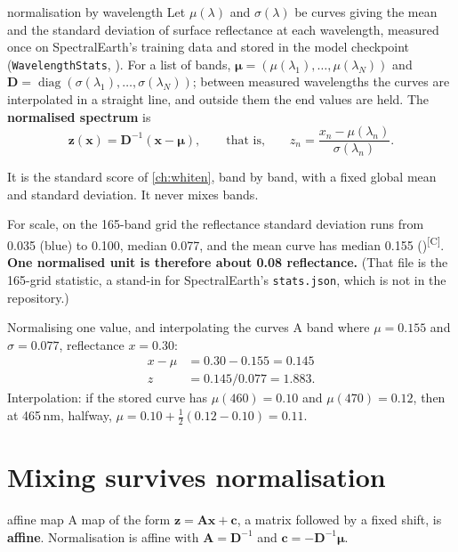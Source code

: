 \documentclass[11pt,a4paper,oneside,openany]{book}
\newcommand{\B}[1]{{\symbf{#1}}}
\newcommand{\B}[1]{{\bm{#1}}}
\newcommand{\comp}{\textsuperscript{\textsf{\scriptsize[C]}}}
\newcommand{\vx}{\B{x}}
\newcommand{\vz}{\B{z}}
\newcommand{\vc}{\B{c}}
\newcommand{\vmu}{\B{\mu}}
\newcommand{\mD}{\B{D}}
\newcommand{\mA}{\B{A}}
\begin{document}
\begin{defn}{normalisation by wavelength}
Let $\mu(\lambda)$ and $\sigma(\lambda)$ be curves giving the mean and the standard deviation of surface reflectance at each
wavelength, measured once on SpectralEarth's training data and stored in the model checkpoint (\texttt{WavelengthStats},
). For a list of bands, $\vmu=(\mu(\lambda_1),\dots,\mu(\lambda_N))$ and
$\mD=\operatorname{diag}(\sigma(\lambda_1),\dots,\sigma(\lambda_N))$; between measured wavelengths the curves are interpolated in a
straight line, and outside them the end values are held. The \textbf{normalised spectrum} is
\[
  \vz(\vx)=\mD^{-1}(\vx-\vmu),\qquad\text{that is,}\qquad z_n=\frac{x_n-\mu(\lambda_n)}{\sigma(\lambda_n)} .
\]
\end{defn}

It is the standard score of \cref{ch:whiten}, band by band, with a fixed global mean and standard deviation. It never mixes bands.

For scale, on the 165-band grid the reflectance standard deviation runs from 0.035 (blue) to 0.100, median 0.077, and the mean curve
has median 0.155 ()\comp. \textbf{One normalised unit is therefore about 0.08 reflectance.} (That
file is the 165-grid statistic, a stand-in for SpectralEarth's \texttt{stats.json}, which is not in the repository.)

\begin{worked}[label=we:norm]{Normalising one value, and interpolating the curves}
A band where $\mu=0.155$ and $\sigma=0.077$, reflectance $x=0.30$:
\begin{align*}
x-\mu &= 0.30-0.155=0.145\\
z &= 0.145/0.077=1.883 .
\end{align*}
Interpolation: if the stored curve has $\mu(460)=0.10$ and $\mu(470)=0.12$, then at 465\,nm, halfway, $\mu=0.10+\frac12(0.12-0.10)=0.11$.
\end{worked}

\section{Mixing survives normalisation}

\begin{defn}{affine map}
A map of the form $\vz=\mA\vx+\vc$, a matrix followed by a fixed shift, is \textbf{affine}. Normalisation is affine with
$\mA=\mD^{-1}$ and $\vc=-\mD^{-1}\vmu$.
\end{defn}
\end{document}
